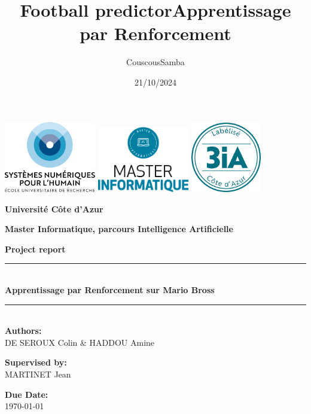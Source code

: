 \documentclass[a4paper,12pt]{article}
\title{Football predictor}
\title{\huge\bf Apprentissage par Renforcement}
\date{21/10/2024}
\author{CouscousSamba}
\begin{document}
\begin{titlepage}
    \begin{center}
        \includegraphics[width=0.3\textwidth]{images/DS4HlogocouleurFR.png} \hfill
        \includegraphics[width=0.3\textwidth]{images/logo_master.png} \hfill
        \includegraphics[width=0.23\textwidth]{images/tampon-3IA.png}
        
        \vspace{1.5cm}
        
        \textbf{\LARGE Université C\^ote d'Azur}
        
        \vspace{0.5cm}
        
        \textbf{\Large Master Informatique, parcours Intelligence Artificielle}
        
        \vspace{1.5cm}
        
        \textbf{\Large Project report}
        
        \vspace{0.5cm}
        
        \rule{\linewidth}{0.5mm} \\[0.4cm]
        {\LARGE \bfseries Apprentissage par Renforcement sur Mario Bross \\[0.2cm]}
        \rule{\linewidth}{0.5mm} \\[1.5cm]
        
        \textbf{Authors:} \\
        DE SEROUX Colin \& HADDOU Amine   \\
        
        \vspace{0.8cm}
        
        \textbf{Supervised by:} \\
        MARTINET Jean\\
        
        \vspace{1.5cm}
        
        \textbf{Due Date:} \\
        \today
        
    \end{center}
\end{titlepage}
\end{document}
